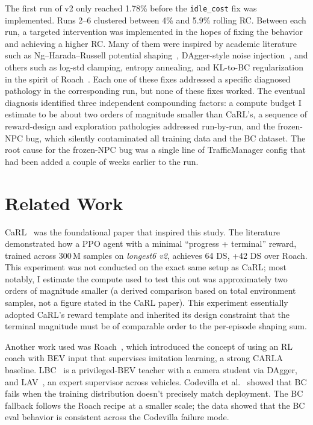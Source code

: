 \documentclass[conference]{IEEEtran}
\begin{document}
The first run of v2 only reached 1.78\% before the
\texttt{idle\_cost} fix was implemented. Runs 2--6 clustered
between 4\% and 5.9\% rolling RC. Between each run, a
targeted intervention was implemented in the hopes of fixing
the behavior and achieving a higher RC. Many of them were
inspired by academic literature such as Ng--Harada--Russell
potential shaping~\cite{ng}, DAgger-style noise
injection~\cite{dagger}, and others such as log-std clamping,
entropy annealing, and KL-to-BC regularization in the spirit
of Roach~\cite{roach}. Each one of these fixes addressed a
specific diagnosed pathology in the corresponding run, but
none of these fixes worked. The eventual diagnosis identified
three independent compounding factors: a compute budget I
estimate to be about two orders of magnitude smaller than
CaRL's, a sequence of
reward-design and exploration pathologies addressed
run-by-run, and the frozen-NPC bug, which silently
contaminated all training data and the BC dataset. The root
cause for the frozen-NPC bug was a single line of
TrafficManager config that had been added a couple of weeks
earlier to the run.

\section{Related Work}

CaRL~\cite{carl} was the foundational paper that inspired
this study. The literature demonstrated how a PPO agent with
a minimal ``progress + terminal'' reward, trained across
300\,M samples on \emph{longest6 v2}, achieves 64 DS, +42 DS
over Roach. This experiment was not conducted on the exact
same setup as CaRL; most notably, I estimate the compute used
to test this out was approximately two orders of magnitude
smaller (a derived comparison based on total environment
samples, not a figure stated in the CaRL paper). This experiment essentially
adopted CaRL's reward
template and inherited its design constraint that the
terminal magnitude must be of comparable order to the
per-episode shaping sum.

Another work used was Roach~\cite{roach}, which introduced
the concept of using an RL coach with BEV input that
supervises imitation learning, a strong CARLA baseline.
LBC~\cite{lbc} is a privileged-BEV teacher with a camera
student via DAgger, and LAV~\cite{lav}, an expert supervisor
across vehicles. Codevilla et al.~\cite{codevilla} showed
that BC fails when the training distribution doesn't
precisely match deployment. The BC fallback follows the
Roach recipe at a smaller scale; the data showed that the
BC eval behavior is consistent across the Codevilla failure
mode.
\end{document}
